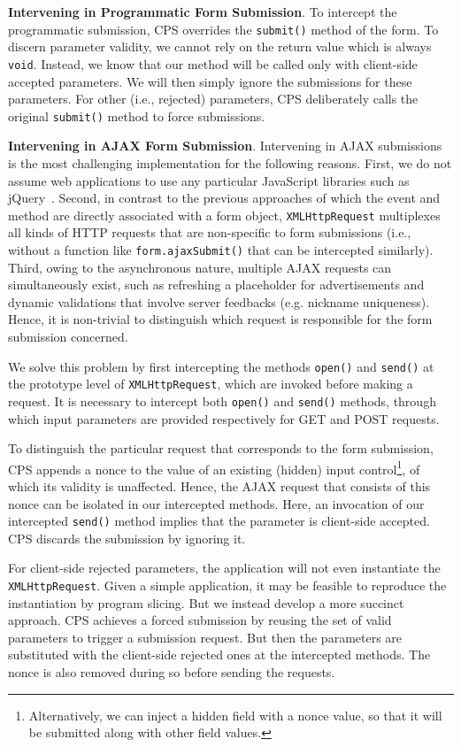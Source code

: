 \documentclass[letter]{sig-alternate-2013}
\begin{document}
\textbf{Intervening in Programmatic Form Submission}. To intercept the programmatic submission, CPS overrides the \verb"submit()" method of the form. To discern parameter validity, we cannot rely on the return value which is always \verb"void". Instead, we know that our method will be called only with client-side accepted parameters. We will then simply ignore the submissions for these parameters. For other (i.e., rejected) parameters, CPS deliberately calls the original \verb"submit()" method to force submissions. 

\textbf{Intervening in AJAX Form Submission}. Intervening in AJAX submissions is the most challenging implementation for the following reasons. First, we do not assume web applications to use any particular JavaScript libraries such as jQuery~\cite{jquery}. Second, in contrast to the previous approaches of which the event and method are directly associated with a form object, \verb"XMLHttpRequest" multiplexes all kinds of HTTP requests that are non-specific to form submissions (i.e., without a function like \verb"form.ajaxSubmit()" that can be intercepted similarly). Third, owing to the asynchronous nature, multiple AJAX requests can simultaneously exist, such as refreshing a placeholder for advertisements and dynamic validations that involve server feedbacks (e.g. nickname uniqueness). Hence, it is non-trivial to distinguish which request is responsible for the form submission concerned.

We solve this problem by first intercepting the methods \verb"open()" and \verb"send()" at the prototype level of \verb"XMLHttpRequest", which are invoked before making a request. It is necessary to intercept both \verb"open()" and \verb"send()" methods, through which input parameters are provided respectively for GET and POST requests.

To distinguish the particular request that corresponds to the form submission, CPS appends a nonce to the value of an existing (hidden) input control\footnote{Alternatively, we can inject a hidden field with a nonce value, so that it will be submitted along with other field values.}, of which its validity is unaffected. Hence, the AJAX request that consists of this nonce can be isolated in our intercepted methods. Here, an invocation of our intercepted \verb"send()" method implies that the parameter is client-side accepted. CPS discards the submission by ignoring it. 

For client-side rejected parameters, the application will not even instantiate the \verb"XMLHttpRequest". Given a simple application, it may be feasible to reproduce the instantiation by program slicing. But we instead develop a more succinct approach. CPS achieves a forced submission by reusing the set of valid parameters to trigger a submission request. But then the parameters are substituted with the client-side rejected ones at the intercepted methods. The nonce is also removed during so before sending the requests.
\end{document}
